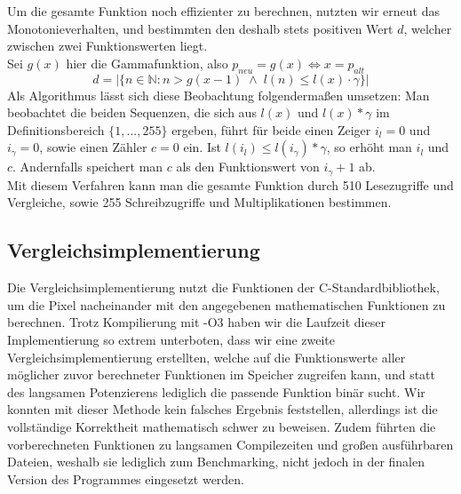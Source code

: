 \documentclass[course=erap]{aspdoc}
\begin{document}
	\noindent
	Um die gesamte Funktion noch effizienter zu berechnen, nutzten wir erneut das Monotonieverhalten, und bestimmten den deshalb stets positiven Wert $d$, welcher zwischen zwei Funktionswerten liegt.\\
	Sei $g(x)$ hier die Gammafunktion, also $p_{neu}=g(x) \iff x = p_{alt}$
	\begin{equation}
	\label{(7)}
	    d= |\{n\in \mathbb{N} : n>g(x-1) \;\wedge\; l(n)\leq l(x)\cdot \gamma\}|
	\end{equation}
	Als Algorithmus lässt sich diese Beobachtung folgendermaßen umsetzen: Man beobachtet die beiden Sequenzen, die sich aus $l(x)$ und $l(x)*\gamma$ im Definitionsbereich $\{1,...,255\}$ ergeben, führt für beide einen Zeiger $i_{l} = 0$ und $i_{\gamma} = 0$, sowie einen Zähler $c = 0$ ein.
	Ist $l(i_{l})\leq l(i_{\gamma})*\gamma$, so erhöht man $i_{l}$ und $c$. Andernfalls speichert man $c$ als den Funktionswert von $i_{\gamma}+1$ ab.\\
	Mit diesem Verfahren kann man die gesamte Funktion durch 510 Lesezugriffe und Vergleiche, sowie 255 Schreibzugriffe und Multiplikationen bestimmen.
	
	\subsection{Vergleichsimplementierung}
	Die Vergleichsimplementierung nutzt die Funktionen der C-Standardbibliothek, um die Pixel nacheinander mit den angegebenen mathematischen Funktionen zu berechnen. Trotz Kompilierung mit -O3 haben wir die Laufzeit dieser Implementierung so extrem unterboten, dass wir eine zweite Vergleichsimplementierung erstellten, welche auf die Funktionswerte aller möglicher zuvor berechneter Funktionen im Speicher zugreifen kann, und statt des langsamen Potenzierens lediglich die passende Funktion binär sucht. Wir konnten mit dieser Methode kein falsches Ergebnis feststellen, allerdings ist die vollständige Korrektheit mathematisch schwer zu beweisen.
	Zudem führten die vorberechneten Funktionen  zu langsamen Compilezeiten und großen ausführbaren Dateien, weshalb sie lediglich zum Benchmarking, nicht jedoch in der finalen Version des Programmes eingesetzt werden.
	
\end{document}
